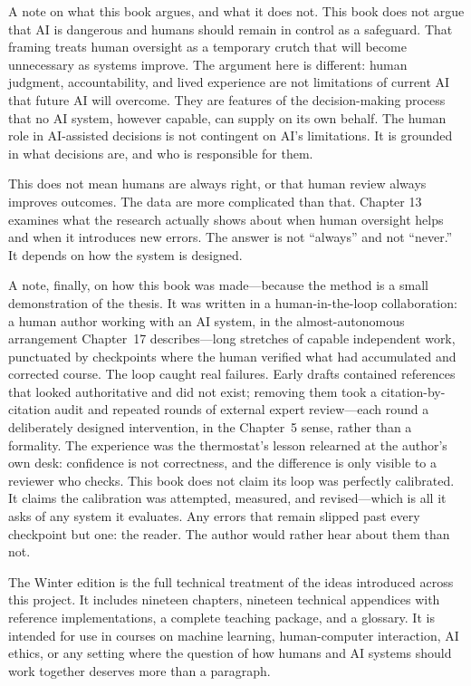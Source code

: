 \medskip

A note on what this book argues, and what it does not. This book does not argue that AI is dangerous and humans should remain in control as a safeguard. That framing treats human oversight as a temporary crutch that will become unnecessary as systems improve. The argument here is different: human judgment, accountability, and lived experience are not limitations of current AI that future AI will overcome. They are features of the decision-making process that no AI system, however capable, can supply on its own behalf. The human role in AI-assisted decisions is not contingent on AI's limitations. It is grounded in what decisions are, and who is responsible for them.

This does not mean humans are always right, or that human review always improves outcomes. The data are more complicated than that. Chapter 13 examines what the research actually shows about when human oversight helps and when it introduces new errors. The answer is not ``always'' and not ``never.'' It depends on how the system is designed.

\medskip

A note, finally, on how this book was made---because the method is a small demonstration of the thesis. It was written in a human-in-the-loop collaboration: a human author working with an AI system, in the almost-autonomous arrangement Chapter~17 describes---long stretches of capable independent work, punctuated by checkpoints where the human verified what had accumulated and corrected course. The loop caught real failures. Early drafts contained references that looked authoritative and did not exist; removing them took a citation-by-citation audit and repeated rounds of external expert review---each round a deliberately designed intervention, in the Chapter~5 sense, rather than a formality. The experience was the thermostat's lesson relearned at the author's own desk: confidence is not correctness, and the difference is only visible to a reviewer who checks. This book does not claim its loop was perfectly calibrated. It claims the calibration was attempted, measured, and revised---which is all it asks of any system it evaluates. Any errors that remain slipped past every checkpoint but one: the reader. The author would rather hear about them than not.

\medskip

The Winter edition is the full technical treatment of the ideas introduced across this project. It includes nineteen chapters, nineteen technical appendices with reference implementations, a complete teaching package, and a glossary. It is intended for use in courses on machine learning, human-computer interaction, AI ethics, or any setting where the question of how humans and AI systems should work together deserves more than a paragraph.

